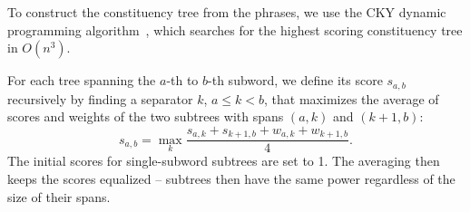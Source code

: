 \documentclass[11pt,a4paper]{article}
\newcommand\ie{i.e.\ }
\def\RR#1{{\color{blue}RR: \it #1}}
\def\JL#1{{\color{magenta}JL: \it #1}}
\def\JL#1{}
\def\RR#1{}
\begin{document}

To construct the constituency tree from the phrases,
we use the CKY dynamic programming algorithm~\cite{ney:1991}, which searches for the highest scoring constituency tree in $O(n^3)$.

For each tree spanning the $a$-th to $b$-th subword, we define its score $s_{a, b}$ recursively by
finding a separator $k$, $a \le k < b$, that maximizes the average of scores and weights of the two subtrees with spans $(a, k)$ and $(k+1,b)$:
%
\begin{equation}
s_{a,b} = \max\limits_{k} \frac{s_{a,k} + s_{k+1,b} + w_{a,k} + w_{k+1,b}}{4}.%
\label{eq:value}
\end{equation}
%
%
The initial scores for single-subword subtrees are set to 1.
The averaging then keeps the scores equalized -- subtrees then have the same power regardless of the size of their spans.
\end{document}
